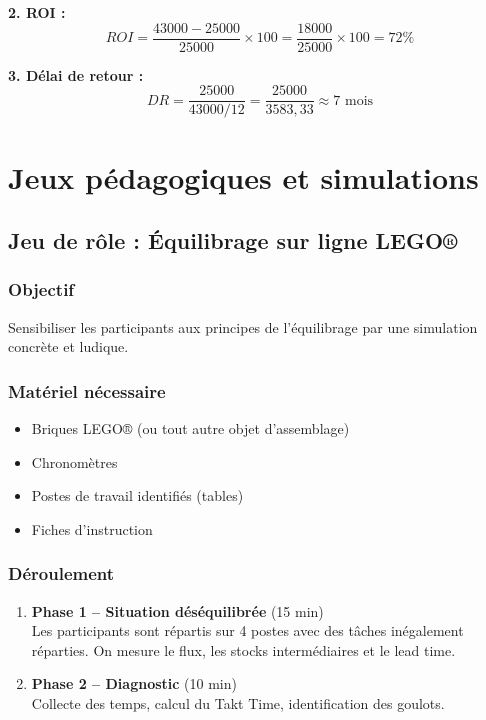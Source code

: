 \documentclass[12pt,a4paper]{article}
\begin{document}
\begin{center}
\textbf{2. ROI :}
\[
ROI = \frac{43 000 - 25 000}{25 000} \times 100 = \frac{18 000}{25 000} \times 100 = 72\%
\]

\textbf{3. Délai de retour :}
\[
DR = \frac{25 000}{43 000 / 12} = \frac{25 000}{3 583,33} \approx 7 \text{ mois}
\]

\section{Jeux pédagogiques et simulations}

\subsection{Jeu de rôle : Équilibrage sur ligne LEGO®}
\subsubsection{Objectif}
Sensibiliser les participants aux principes de l’équilibrage par une simulation concrète et ludique.

\subsubsection{Matériel nécessaire}
\begin{itemize}
    \item Briques LEGO® (ou tout autre objet d’assemblage)
    \item Chronomètres
    \item Postes de travail identifiés (tables)
    \item Fiches d’instruction
\end{itemize}

\subsubsection{Déroulement}
\begin{enumerate}
    \item \textbf{Phase 1 – Situation déséquilibrée} (15 min) \\
    Les participants sont répartis sur 4 postes avec des tâches inégalement réparties. On mesure le flux, les stocks intermédiaires et le lead time.
    
    \item \textbf{Phase 2 – Diagnostic} (10 min) \\
    Collecte des temps, calcul du Takt Time, identification des goulots.
    

\end{enumerate}
\end{center}
\end{document}
